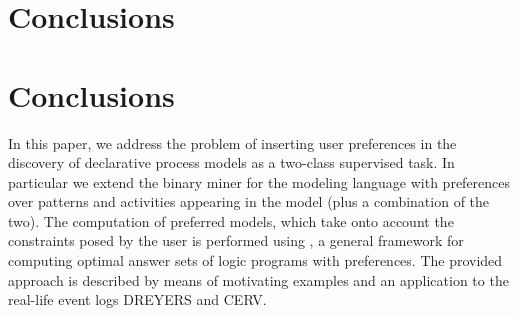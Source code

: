 
\section{Conclusions}
\label{sec:conclusions}

\section{Conclusions}
\label{sec:conclusions}

In this paper, we address the problem of inserting user preferences in the discovery of declarative process models as a two-class supervised task. In particular we extend the \nd binary miner for the \declare modeling language with preferences over \declare patterns and activities appearing in the model (plus a combination of the two). 
The computation of preferred models, which take onto account the constraints posed by the user is performed using \asprin, a general framework for computing optimal answer sets of logic programs with preferences. The provided approach is described by means of motivating examples and an application to the real-life event logs DREYERS and CERV. 




